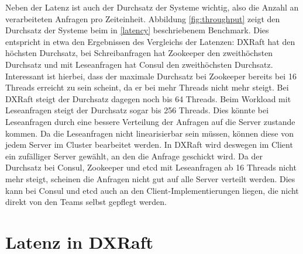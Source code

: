 Neben der Latenz ist auch der Durchsatz der Systeme wichtig, also die Anzahl an verarbeiteten Anfragen pro Zeiteinheit. Abbildung \ref{fig:throughput} zeigt den Durchsatz der Systeme beim in \ref{latency} beschriebenem Benchmark. Dies entspricht in etwa den Ergebnissen des Vergleichs der Latenzen: DXRaft hat den höchsten Durchsatz, bei Schreibanfragen hat Zookeeper den zweithöchsten Durchsatz und mit Leseanfragen hat Consul den zweithöchsten Durchsatz. \\
Interessant ist hierbei, dass der maximale Durchsatz bei Zookeeper bereits bei 16 Threads erreicht zu sein scheint, da er bei mehr Threads nicht mehr steigt. Bei DXRaft steigt der Durchsatz dagegen noch bis 64 Threads. Beim Workload mit Leseanfragen steigt der Durchsatz sogar bis 256 Threads. Dies könnte bei Leseanfragen durch eine bessere Verteilung der Anfragen auf die Server zustande kommen. Da die Leseanfragen nicht linearisierbar sein müssen, können diese von jedem Server im Cluster bearbeitet werden. In DXRaft wird deswegen im Client ein zufälliger Server gewählt, an den die Anfrage geschickt wird. Da der Durchsatz bei Consul, Zookeeper und etcd mit Leseanfragen ab 16 Threads nicht mehr steigt, scheinen die Anfragen nicht gut auf alle Server verteilt werden. Dies kann bei Consul und etcd auch an den Client-Implementierungen liegen, die nicht direkt von den Teams selbst gepflegt werden.

\section{Latenz in DXRaft}
\label{dxraft-latency}

